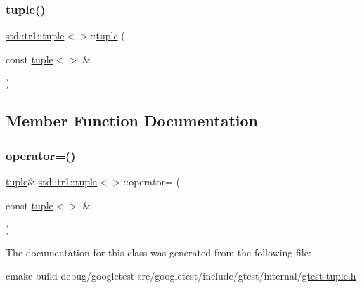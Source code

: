 \mbox{\label{classstd_1_1tr1_1_1tuple_3_4_aa857599acb126134e29dc5e53fd9d1a7}} 
\subsubsection{\texorpdfstring{tuple()}{tuple()}\hspace{0.1cm}{\footnotesize\ttfamily [2/2]}}
{\footnotesize\ttfamily \mbox{\hyperlink{classstd_1_1tr1_1_1tuple}{std\+::tr1\+::tuple}}$<$$>$\+::\mbox{\hyperlink{classstd_1_1tr1_1_1tuple}{tuple}} (\begin{DoxyParamCaption}\item[{const \mbox{\hyperlink{classstd_1_1tr1_1_1tuple}{tuple}}$<$$>$ \&}]{ }\end{DoxyParamCaption})\hspace{0.3cm}{\ttfamily [inline]}}



\subsection{Member Function Documentation}
\mbox{\label{classstd_1_1tr1_1_1tuple_3_4_a93ddab6f662662fc49635608619150c8}} 
\subsubsection{\texorpdfstring{operator=()}{operator=()}}
{\footnotesize\ttfamily \mbox{\hyperlink{classstd_1_1tr1_1_1tuple}{tuple}}\& \mbox{\hyperlink{classstd_1_1tr1_1_1tuple}{std\+::tr1\+::tuple}}$<$$>$\+::operator= (\begin{DoxyParamCaption}\item[{const \mbox{\hyperlink{classstd_1_1tr1_1_1tuple}{tuple}}$<$$>$ \&}]{ }\end{DoxyParamCaption})\hspace{0.3cm}{\ttfamily [inline]}}



The documentation for this class was generated from the following file\+:\begin{DoxyCompactItemize}
\item 
cmake-\/build-\/debug/googletest-\/src/googletest/include/gtest/internal/\mbox{\hyperlink{gtest-tuple_8h}{gtest-\/tuple.\+h}}\end{DoxyCompactItemize}
